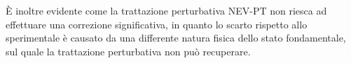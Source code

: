 \clearpage

\`E inoltre evidente come la trattazione perturbativa NEV-PT non riesca ad
effettuare una correzione significativa, in quanto lo scarto rispetto allo
sperimentale \`e causato da una differente natura fisica dello stato
fondamentale, sul quale la trattazione perturbativa non pu\`o recuperare.

